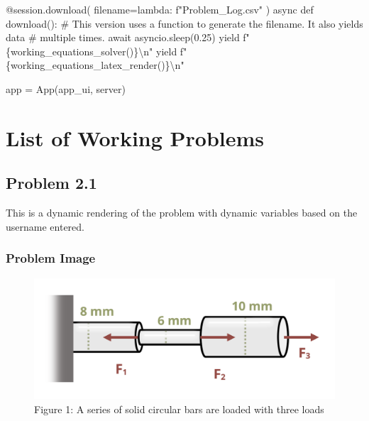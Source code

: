 \documentclass[
  letterpaper,
  DIV=11,
  numbers=noendperiod]{scrreprt}
\newenvironment{Shaded}{\begin{snugshade}}{\end{snugshade}}
\newcommand{\NormalTok}[1]{\textcolor[rgb]{0.00,0.23,0.31}{#1}}
\begin{document}
\begin{Shaded}
\begin{Highlighting}[]
        
\NormalTok{    @session.download(}
\NormalTok{    filename=lambda: f"Problem\_Log.csv"}
\NormalTok{    )}
\NormalTok{    async def download():}
\NormalTok{        \# This version uses a function to generate the filename. It also yields data}
\NormalTok{        \# multiple times.}
\NormalTok{          await asyncio.sleep(0.25)}
\NormalTok{          yield f"\{working\_equations\_solver()\}\textbackslash{}n"}
\NormalTok{          yield f"\{working\_equations\_latex\_render()\}\textbackslash{}n"}

\NormalTok{app = App(app\_ui, server)}



\end{Highlighting}
\end{Shaded}

\part{List of Working Problems}

\chapter*{Problem 2.1}\label{problem-2.1-2}


This is a dynamic rendering of the problem with dynamic variables based
on the username entered.

\section*{Problem Image}\label{problem-image-20}


\begin{figure}[H]

{\centering \includegraphics{images/138.png}

}

\caption{Figure 1: A series of solid circular bars are loaded with three
loads}

\end{figure}%
\end{document}
